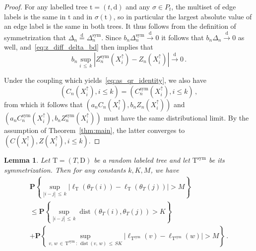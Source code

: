 \documentclass[10pt]{amsart}
\newtheorem{lemm}[theo]{Lemma}\newtheorem{prop}[theo]{Proposition}\newtheorem{coro}[theo]{Corollary}\newtheorem{conj}[theo]{Conjecture}
\theoremstyle{definition}\newtheorem{defi}[theo]{Definition}\newtheorem{rema}[theo]{Remark}\newtheorem{exam}[theo]{Example}\newtheorem{exem}[theo]{Example}\newtheorem{nota}[theo]{Notation}
\newcommand{\rD}{\mathrm{D}}
\newcommand{\rT}{\mathrm{T}}
\newcommand{\rd}{\mathrm{d}}
\newcommand{\rt}{\mathrm{t}}
\DeclareMathOperator{\sym}{sym}
\DeclareMathOperator{\dist}{dist}
\newcommand{\p}[1]{\mathbf{P}\left\{#1\right\}}
\newcommand{\unif}{\ensuremath{X}}
\newcommand{\eqdist}{\ensuremath{\stackrel{\mathrm{d}}{=}}}
\newcommand{\convdist}{\ensuremath{\stackrel{\mathrm{d}}{\rightarrow}}}
\begin{document}
\begin{proof}
For any labelled tree $\rt=(t,\rd)$ and any $\sigma \in P_t$, the multiset of edge labels is the same in $\rt$ and in $\sigma(\rt)$, so in particular the largest absolute value of an edge label is the same in both trees. It thus follows from the definition of symmetrization that $\Delta_n \eqdist \Delta_n^{\sym}$. Since $b_n\Delta_n^{\sym} \convdist 0$ it follows that $b_n \Delta_n \convdist 0$ as well, and~\eqref{eq:z_diff_delta_bd} then implies that
\[
b_n \sup_{i\,\le\,k} \left|Z_n^{\sym}\left(\unif_i^\uparrow\right) - Z_n\left(\unif_i^\uparrow\right)\right|
\convdist 0\,.
\]

Under the coupling which yields~\eqref{eq:as_qr_identity}, we also have
\[
\left(C_n\left(\unif_i^\uparrow\right),i \le k\right)=\left(C_n^{\sym}\left(\unif_i^\uparrow\right),i \le k\right)\,,
\]
from which it follows that $(a_n C_n(\unif_i^\uparrow),b_n Z_n(\unif_i^\uparrow))$ and $(a_n C_n^{\sym}(\unif_i^\uparrow),b_n Z_n^{\sym}(\unif_i^\uparrow))$ must have the same distributional limit. By the assumption of Theorem~\ref{thm:main}, the latter converges to $(C(\unif_i^\uparrow),Z(\unif_i^\uparrow),i \le k)$.
\end{proof}

\begin{lemm}\label{lem:boundLabels}
Let $\rT=(T,\rD)$ be a random labeled tree and let $\rT^{\sym}$ be its symmetrization. Then for any constants $k,K,M$, we have
\begin{multline*}
 \p{\sup_{|i-j|\,\le\,k} \left|\ell_\rT(\theta_T(i)) -\ell_\rT(\theta_T(j))\right| > M}\\
\le 
\p{\sup_{|i-j|\,\le\,k} \dist(\theta_T(i),\theta_T(j)) > K}\\
 +\p{
\sup_{v,\,w\,\in\,\rT^{\sym}\,:\,\dist(v,\,w)\,\le\,SK} \left|\ell_{\rT^{\sym}}(v) - \ell_{\rT^{\sym}}(w)\right| > M}\,.
\end{multline*}
\end{lemm}
\end{document}
